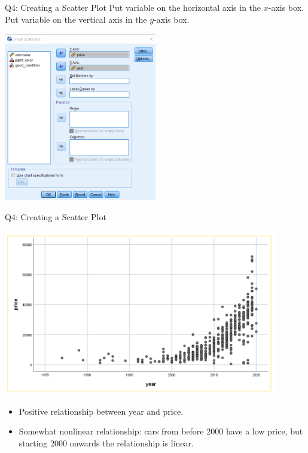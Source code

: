 \documentclass[11pt]{beamer}
\begin{document}
\begin{frame}{Q4: Creating a Scatter Plot}
  Put variable on the horizontal axis in the $x$-axis box. \\
  Put variable on the vertical axis in the $y$-axis box.
  \begin{center}
    \includegraphics[width=0.5\textwidth]{f150-scatter-dialog.png}
  \end{center}
\end{frame}

\begin{frame}{Q4: Creating a Scatter Plot}
  \begin{center}
    \includegraphics[width=0.9\textwidth]{f150-scatter-year-price.png}
  \end{center}
  \begin{itemize}
    \item Positive relationship between year and price.
    \item Somewhat nonlinear relationship: cars from before 2000 have a low price, but starting 2000 onwards the relationship is linear.
  \end{itemize}
\end{frame}
\end{document}
